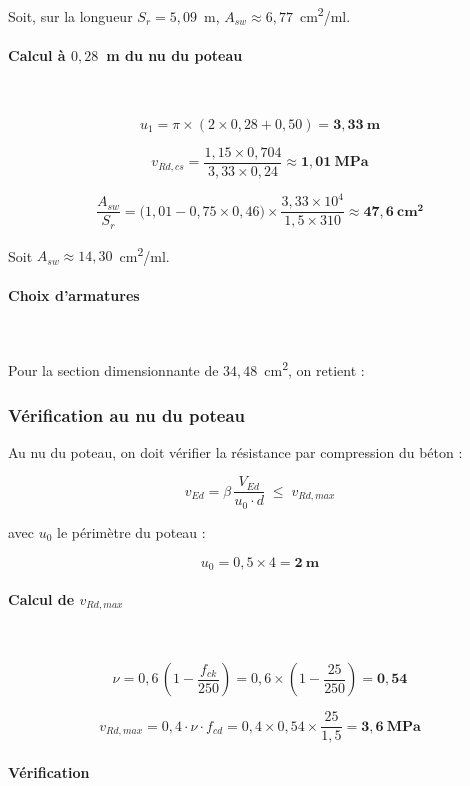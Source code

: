 Soit, sur la longueur $S_r = 5{,}09$~m, $A_{sw} \approx 6{,}77$~cm\textsuperscript{2}/ml.

\paragraph{Calcul à $0{,}28$~m du nu du poteau}~

\[
u_1 = \pi \times (2 \times 0{,}28 + 0{,}50) = \mathbf{3{,}33~\text{m}}
\]

\[
v_{Rd,cs} = \frac{1{,}15 \times 0{,}704}{3{,}33 \times 0{,}24} \approx \mathbf{1{,}01~\text{MPa}}
\]

\[
\frac{A_{sw}}{S_r} = \big(1{,}01 - 0{,}75 \times 0{,}46\big) \times \frac{3{,}33 \times 10^4}{1{,}5 \times 310} \approx \mathbf{47{,}6~\text{cm}^2}
\]

Soit $A_{sw} \approx 14{,}30$~cm\textsuperscript{2}/ml.

\paragraph{Choix d'armatures}~

Pour la section dimensionnante de $34{,}48$~cm\textsuperscript{2}, on retient :


\subsubsection{Vérification au nu du poteau}

Au nu du poteau, on doit vérifier la résistance par compression du béton :

\[
v_{Ed} = \beta \, \frac{V_{Ed}}{u_0 \cdot d} \;\leq\; v_{Rd,max}
\]

avec $u_0$ le périmètre du poteau :

\[
u_0 = 0{,}5 \times 4 = \mathbf{2~\text{m}}
\]

\paragraph{Calcul de $v_{Rd,max}$}~

\[
\nu = 0{,}6 \, \left(1 - \frac{f_{ck}}{250}\right) = 0{,}6 \times \left(1 - \frac{25}{250}\right) = \mathbf{0{,}54}
\]

\[
v_{Rd,max} = 0{,}4 \cdot \nu \cdot f_{cd} = 0{,}4 \times 0{,}54 \times \frac{25}{1{,}5} = \mathbf{3{,}6~\text{MPa}}
\]

\paragraph{Vérification}~

